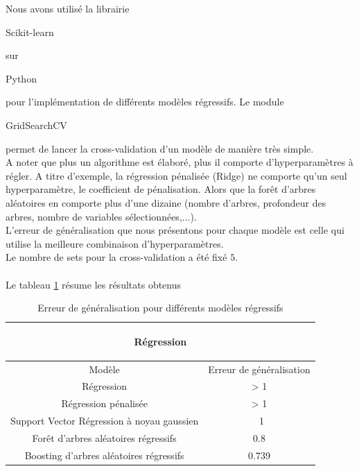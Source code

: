 \documentclass{book}
\begin{document}
Nous avons utilisé la librairie \begin{itshape}Scikit-learn\end{itshape}\cite{scikit-learn} sur \begin{itshape}Python\end{itshape} 
pour l'implémentation de différents modèles régressifs. Le module \begin{itshape}GridSearchCV\end{itshape} permet de lancer
la cross-validation d'un modèle de manière très simple.\\
A noter que plus un algorithme est élaboré, plus il comporte d'hyperparamètres à régler. A titre d'exemple, la régression pénalisée (Ridge)
ne comporte qu'un seul hyperparamètre, le coefficient de pénalisation. Alors que la for\^{e}t d'arbres aléatoires en comporte plus d'une dizaine
(nombre d'arbres, profondeur des arbres, nombre de variables sélectionnées,...).\\
L'erreur de généralisation que nous présentons pour chaque modèle 
est celle qui utilise la meilleure combinaison d'hyperparamètres.\\
Le nombre de sets pour la cross-validation a été fixé $5$.\\
\\
Le tableau \ref{regression_resultats} résume les résultats obtenus\\
\begin{table}[H]
\begin{center}
\begin{adjustbox}{max width=\textwidth}
\begin{tabular}{|c|c|}
\hline
\multicolumn{2}{c|}{\begin{bf}Régression\end{bf}} \\
\hline 
Modèle & Erreur de généralisation \\
\hline 
Régression & > 1\\
\hline 
Régression pénalisée & > 1 \\
\hline 
Support Vector Régression à noyau gaussien & ~1 \\
\hline
For\^{e}t d'arbres aléatoires régressifs & 0.8\\
\hline
Boosting d'arbres aléatoires régressifs & 0.739\\
\hline
\end{tabular}
\end{adjustbox}
\end{center}
\caption{Erreur de généralisation pour différents modèles régressifs}
\label{regression_resultats}
\end{table}
\end{document}
